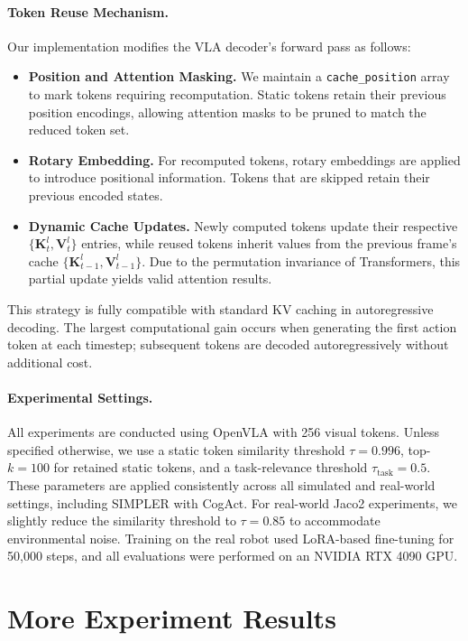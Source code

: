 \paragraph{Token Reuse Mechanism.}
Our implementation modifies the VLA decoder’s forward pass as follows:
\begin{itemize}
    \item \textbf{Position and Attention Masking.} We maintain a \texttt{cache\_position} array to mark tokens requiring recomputation. Static tokens retain their previous position encodings, allowing attention masks to be pruned to match the reduced token set.
    \item \textbf{Rotary Embedding.} For recomputed tokens, rotary embeddings are applied to introduce positional information. Tokens that are skipped retain their previous encoded states.
    \item \textbf{Dynamic Cache Updates.} Newly computed tokens update their respective \(\{\mathbf{K}_t^l, \mathbf{V}_t^l\}\) entries, while reused tokens inherit values from the previous frame’s cache \(\{\mathbf{K}_{t-1}^l, \mathbf{V}_{t-1}^l\}\). Due to the permutation invariance of Transformers, this partial update yields valid attention results.
\end{itemize}
This strategy is fully compatible with standard KV caching in autoregressive decoding. The largest computational gain occurs when generating the first action token at each timestep; subsequent tokens are decoded autoregressively without additional cost.

\paragraph{Experimental Settings.}
All experiments are conducted using OpenVLA with 256 visual tokens. Unless specified otherwise, we use a static token similarity threshold \( \tau = 0.996 \), top-\(k = 100\) for retained static tokens, and a task-relevance threshold \( \tau_{\text{task}} = 0.5 \). These parameters are applied consistently across all simulated and real-world settings, including SIMPLER with CogAct. For real-world Jaco2 experiments, we slightly reduce the similarity threshold to \( \tau = 0.85 \) to accommodate environmental noise. Training on the real robot used LoRA-based fine-tuning for 50,000 steps, and all evaluations were performed on an NVIDIA RTX 4090 GPU.

\section{More Experiment Results}

